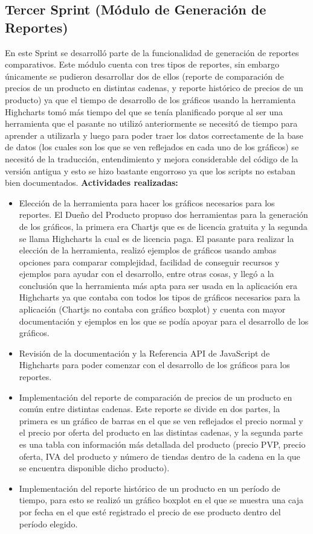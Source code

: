 \subsection{Tercer Sprint (Módulo de Generación de Reportes)}
En este Sprint se desarrolló parte de la funcionalidad de generación de reportes comparativos. Este módulo cuenta con tres tipos de reportes, sin embargo únicamente se pudieron desarrollar dos de ellos (reporte de comparación de precios de un producto en distintas cadenas, y reporte histórico de precios de un producto) ya que el tiempo de desarrollo de los gráficos usando la herramienta Highcharts tomó más tiempo del que se tenía planificado porque al ser una herramienta que el pasante no utilizó anteriormente se necesitó de tiempo para aprender a utilizarla y luego para poder traer los datos correctamente de la base de datos (los cuales son los que se ven reflejados en cada uno de los gráficos) se necesitó de la traducción, entendimiento y mejora considerable del código de la versión antigua y esto se hizo bastante engorroso ya que los scripts no estaban bien documentados.
\vskip 0.5cm
\textbf{Actividades realizadas:}
\begin{itemize}
   \item Elección de la herramienta para hacer los gráficos necesarios para los reportes. El Dueño del Producto propuso dos herramientas para la generación de los gráficos, la primera era Chartjs que es de licencia gratuita y la segunda se llama Highcharts la cual es de licencia paga. El pasante para realizar la elección de la herramienta, realizó ejemplos de gráficos usando ambas opciones para comparar complejidad, facilidad de conseguir recursos y ejemplos para ayudar con el desarrollo, entre otras cosas, y llegó a la conclusión que la herramienta más apta para ser usada en la aplicación era Highcharts ya que contaba con todos los tipos de gráficos necesarios para la aplicación (Chartjs no contaba con gráfico boxplot) y cuenta con mayor documentación y ejemplos en los que se podía apoyar para el desarrollo de los gráficos. 
   \item Revisión de la documentación y la Referencia API de JavaScript de Highcharts para poder comenzar con el desarrollo de los gráficos para los reportes.
   \item Implementación del reporte de comparación de precios de un producto en común entre distintas cadenas. Este reporte se divide en dos partes, la primera es un gráfico de barras en el que se ven reflejados el precio normal y el precio por oferta del producto en las distintas cadenas, y la segunda parte es una tabla con información más detallada del producto (precio PVP, precio oferta, IVA del producto y número de tiendas dentro de la cadena en la que se encuentra disponible dicho producto).
   \item Implementación del reporte histórico de un producto en un período de tiempo, para esto se realizó un gráfico boxplot en el que se muestra una caja por fecha en el que esté registrado el precio de ese producto dentro del período elegido.
\end{itemize}

